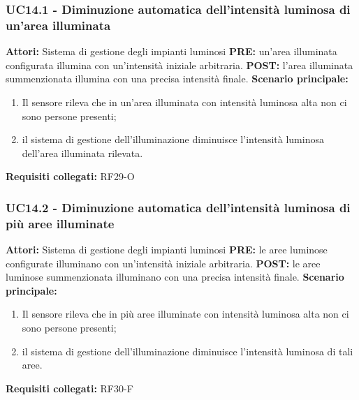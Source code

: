 \documentclass[a4paper, 12pt]{article}
\begin{document}
\subsubsection{UC14.1 - Diminuzione automatica dell'intensità luminosa di un'area illuminata}
\textbf{Attori:} Sistema di gestione degli impianti luminosi \newline
\textbf{PRE:} un'area illuminata configurata illumina con un'intensità iniziale arbitraria.\newline
\textbf{POST:} l'area illuminata summenzionata illumina con una precisa intensità finale.\newline
\textbf{Scenario principale:}
\begin{enumerate}
    \item Il sensore rileva che in un'area illuminata con intensità luminosa alta non ci sono persone presenti;
    \item il sistema di gestione dell'illuminazione diminuisce l'intensità luminosa dell'area illuminata rilevata.
\end{enumerate}
\textbf{Requisiti collegati:} RF29-O\newline

\subsubsection{UC14.2 - Diminuzione automatica dell'intensità luminosa di più aree illuminate}
\textbf{Attori:} Sistema di gestione degli impianti luminosi \newline
\textbf{PRE:} le aree luminose configurate illuminano con un'intensità iniziale arbitraria.\newline
\textbf{POST:} le aree luminose summenzionata illuminano con una precisa intensità finale.\newline
\textbf{Scenario principale:}
\begin{enumerate}
    \item Il sensore rileva che in più aree illuminate con intensità luminosa alta non ci sono persone presenti;
    \item il sistema di gestione dell'illuminazione diminuisce l'intensità luminosa di tali aree.
\end{enumerate}
\textbf{Requisiti collegati:} RF30-F\newline
\end{document}
